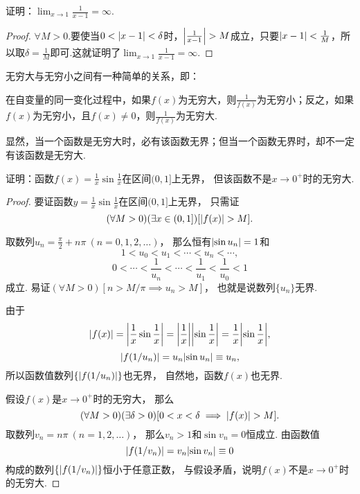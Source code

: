 \begin{example}
证明：\(\lim_{x\to1}\frac{1}{x-1}=\infty\).
\begin{proof}
\(\forall M>0\).要使当\(0<\abs{x-1}<\delta\)时，\(\abs{\frac{1}{x-1}}>M\)成立，只要\(\abs{x-1}<\frac{1}{M}\)，所以取\(\delta=\frac{1}{M}\)即可.这就证明了\(\lim_{x\to1}\frac{1}{x-1}=\infty\).
\end{proof}
\end{example}

无穷大与无穷小之间有一种简单的关系，即：
\begin{theorem}\label{theorem:极限.无穷大与无穷小的关系}
在自变量的同一变化过程中，如果\(f(x)\)为无穷大，则\(\frac{1}{f(x)}\)为无穷小；反之，如果\(f(x)\)为无穷小，且\(f(x) \neq 0\)，则\(\frac{1}{f(x)}\)为无穷大.
\end{theorem}

显然，当一个函数是无穷大时，必有该函数无界；但当一个函数无界时，却不一定有该函数是无穷大.
\begin{example}
证明：函数\(f(x) = \frac{1}{x} \sin\frac{1}{x}\)在区间\((0,1]\)上无界，
但该函数不是\(x\to0^+\)时的无穷大.
\begin{proof}
要证函数\(y = \frac{1}{x} \sin\frac{1}{x}\)在区间\((0,1]\)上无界，
只需证\[
	(\forall M > 0)
	(\exists x \in (0,1])
	[\abs{f(x)} > M].
\]

取数列\(u_n = \frac{\pi}{2} + n\pi\ (n=0,1,2,\dotsc)\)，
那么恒有\(\abs{\sin u_n} = 1\)和\[
	1 < u_0 < u_1 < \dotsb < u_n < \dotsb,
\]\[
	0 < \dotsb < \frac{1}{u_n} < \dotsb < \frac{1}{u_1} < \frac{1}{u_0} < 1
\]成立.
易证\((\forall M > 0)[n > M/\pi \implies u_n > M]\)，
也就是说数列\(\{u_n\}\)无界.

由于\[
	\abs{f(x)} = \abs{\frac{1}{x} \sin\frac{1}{x}}
	= \abs{\frac{1}{x}} \abs{\sin\frac{1}{x}}
	= \frac{1}{x} \abs{\sin\frac{1}{x}},
\]\[
	\abs{f(1/u_n)}
	= u_n \abs{\sin u_n} \equiv u_n,
\]
所以函数值数列\(\{\abs{f(1/u_n)}\}\)也无界，
自然地，函数\(f(x)\)也无界.

假设\(f(x)\)是\(x\to0^+\)时的无穷大，
那么\[
	(\forall M > 0)
	(\exists \delta > 0)
	[
		0 < x < \delta
		\implies
		\abs{f(x)} > M
	].
\]
取数列\(v_n = n\pi\ (n=1,2,\dotsc)\)，
那么\(v_n > 1\)和\(\sin v_n = 0\)恒成立.
由函数值\[
	\abs{f(1/v_n)} = v_n \abs{\sin v_n} \equiv 0
\]构成的数列\(\{\abs{f(1/v_n)}\}\)恒小于任意正数，
与假设矛盾，说明\(f(x)\)不是\(x\to0^+\)时的无穷大.
\end{proof}
\end{example}
